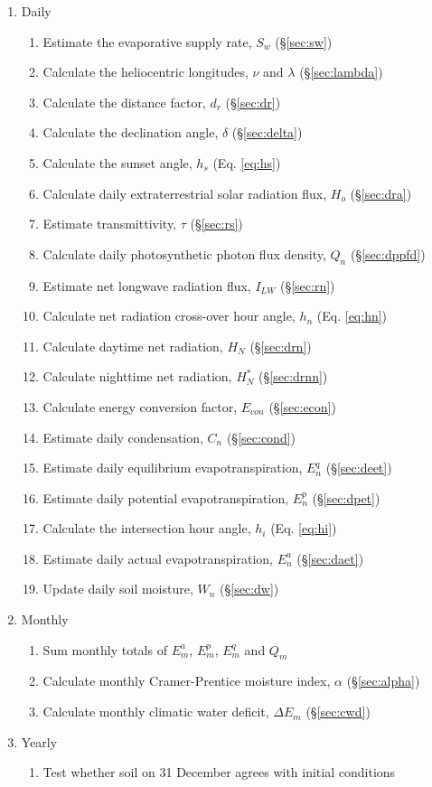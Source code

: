 \begin{enumerate}
	\item Daily
	\begin{enumerate}
		\item Estimate the evaporative supply rate, $S_w$ (\S \ref{sec:sw})
		\item Calculate the heliocentric longitudes, 
		      $\nu$ and $\lambda$ (\S \ref{sec:lambda})
		\item Calculate the distance factor, $d_r$ 
		      (\S \ref{sec:dr})
		\item Calculate the declination angle, $\delta$ 
		      (\S \ref{sec:delta})
		\item Calculate the sunset angle, $h_s$ (Eq. \ref{eq:hs})
		\item Calculate daily extraterrestrial solar radiation flux, $H_o$ 
		      (\S \ref{sec:dra})
		\item Estimate transmittivity, $\tau$ (\S \ref{sec:rs})
		\item Calculate daily photosynthetic photon flux density, $Q_n$ 
		      (\S \ref{sec:dppfd})
		\item Estimate net longwave radiation flux, $I_{LW}$ (\S \ref{sec:rn})
		\item Calculate net radiation cross-over hour angle, $h_n$ 
		      (Eq. \ref{eq:hn})
		\item Calculate daytime net radiation, $H_{N}$ (\S \ref{sec:drn})
		\item Calculate nighttime net radiation, $H_{N}^{\ast}$ (\S \ref{sec:drnn})
		\item Calculate energy conversion factor, $E_{con}$ (\S \ref{sec:econ})
		\item Estimate daily condensation, $C_n$ (\S \ref{sec:cond})
		\item Estimate daily equilibrium evapotranspiration, $E_n^q$ 
		      (\S \ref{sec:deet})
		\item Estimate daily potential evapotranspiration, $E_n^p$ 
		      (\S \ref{sec:dpet})
		\item Calculate the intersection hour angle, $h_i$ (Eq. \ref{eq:hi})
		\item Estimate daily actual evapotranspiration, $E_n^a$ 
		      (\S \ref{sec:daet})
		\item Update daily soil moisture, $W_n$ (\S \ref{sec:dw})
	\end{enumerate}
	\item Monthly
	\begin{enumerate}
		\item Sum monthly totals of $E_m^a$, $E_m^p$, $E_m^q$ and $Q_m$
		\item Calculate monthly Cramer-Prentice moisture index, $\alpha$ 
		      (\S \ref{sec:alpha})
		\item Calculate monthly climatic water deficit, $\Delta E_m$ 
		      (\S \ref{sec:cwd})
	\end{enumerate}
	\item Yearly
	\begin{enumerate}
		\item Test whether soil on 31 December agrees with initial conditions
	\end{enumerate}
\end{enumerate}

